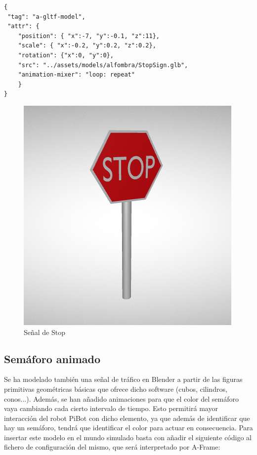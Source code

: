 \documentclass{report}
\begin{document}
\begin{lstlisting}[backgroundcolor = \color{light-gray},
				   aboveskip = 2em,
				   belowskip = 2em,
                   xleftmargin = 2cm,
                   framexleftmargin = 1em,
                   basicstyle=\small]
{
 "tag": "a-gltf-model",
 "attr": {
	"position": { "x":-7, "y":-0.1, "z":11},
	"scale": { "x":-0.2, "y":0.2, "z":0.2},
	"rotation": {"x":0, "y":0},
	"src": "../assets/models/alfombra/StopSign.glb",
	"animation-mixer": "loop: repeat"
	}
}
\end{lstlisting}

\renewcommand{\figurename}{Figura}		
\begin{figure}[h]
	\centering
	 \includegraphics[scale=0.35]{images/cap4/stop.png}
	 \caption{Señal de Stop}
\end{figure}



\subsection{Semáforo animado}
Se ha modelado también una señal de tráfico en Blender a partir de las figuras primitivas geométricas básicas que ofrece dicho software (cubos, cilindros, conos...). Además, se han añadido animaciones para que el color del semáforo vaya cambiando cada cierto intervalo de tiempo. Esto permitirá mayor interacción del robot PiBot con dicho elemento, ya que además de identificar que hay un semáforo, tendrá que identificar el color para actuar en consecuencia. Para insertar este modelo en el mundo simulado basta con añadir el siguiente código al fichero de configuración del mismo, que será interpretado por A-Frame:
\end{document}
